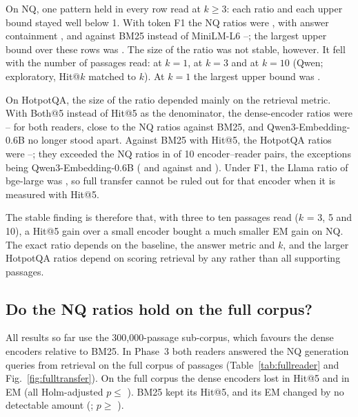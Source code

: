 On NQ, one pattern held in every row read at $k\geq 3$: each ratio and each upper bound stayed well below 1. With token F1 the NQ ratios were , with answer containment , and against BM25 instead of MiniLM-L6 --; the largest upper bound over these rows was . The size of the ratio was not stable, however. It fell with the number of passages read:  at $k=1$,  at $k=3$ and  at $k=10$ (Qwen; exploratory, Hit@$k$ matched to $k$). At $k=1$ the largest upper bound was .

On HotpotQA, the size of the ratio depended mainly on the retrieval metric. With Both@5 instead of Hit@5 as the denominator, the dense-encoder ratios were -- for both readers, close to the NQ ratios against BM25, and Qwen3-Embedding-0.6B no longer stood apart. Against BM25 with Hit@5, the HotpotQA ratios were --; they exceeded the NQ ratios in  of 10 encoder--reader pairs, the exceptions being Qwen3-Embedding-0.6B ( and  against  and ). Under F1, the Llama ratio of bge-large was  , so full transfer cannot be ruled out for that encoder when it is measured with Hit@5.

The stable finding is therefore that, with three to ten passages read ($k$ = 3, 5 and 10), a Hit@5 gain over a small encoder bought a much smaller EM gain on NQ. The exact ratio depends on the baseline, the answer metric and $k$, and the larger HotpotQA ratios depend on scoring retrieval by any rather than all supporting passages.



\subsection{Do the NQ ratios hold on the full corpus?}\label{sec:res-full}
All results so far use the 300,000-passage sub-corpus, which favours the dense encoders relative to BM25. In Phase~3 both readers answered the NQ generation queries from retrieval on the full corpus of  passages (Table~\ref{tab:fullreader} and Fig.~\ref{fig:fulltransfer}). On the full corpus the dense encoders lost  in Hit@5 and  in EM (all Holm-adjusted $p\le$ ). BM25 kept its Hit@5, and its EM changed by no detectable amount (; $p\ge$ ).

